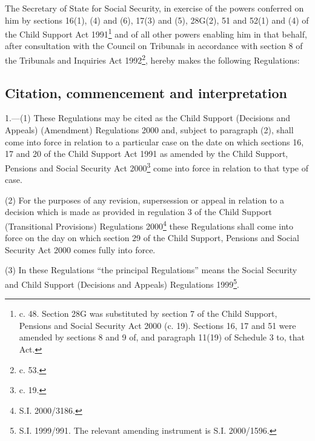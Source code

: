 \documentclass[12pt,a4paper]{article}
\title{\regstitle}
\author{S.I. 2000 No. 3185}
\date{Made 4th December 2000\\Laid before Parliament 6th December 2000\\Coming into force as provided in regulation 1(1)}
\begin{document}
\maketitle

\noindent
The Secretary of State for Social Security, in exercise of the powers conferred on him by sections 16(1), (4) and (6), 17(3) and (5), 28G(2), 51 and 52(1) and (4) of the Child Support Act 1991\footnote{ c. 48. Section 28G was substituted by section 7 of the Child Support, Pensions and Social Security Act 2000 (c. 19). Sections 16, 17 and 51 were amended by sections 8 and 9 of, and paragraph 11(19) of Schedule 3 to, that Act.} and of all other powers enabling him in that behalf, after consultation with the Council on Tribunals in accordance with section 8 of the Tribunals and Inquiries Act 1992\footnote{ c. 53.}, hereby makes the following Regulations: 

{\sloppy

\tableofcontents

}

\bigskip

\setcounter{secnumdepth}{-2}

\subsection[1. Citation, commencement and interpretation]{Citation, commencement and interpretation}

1.---(1)  These Regulations may be cited as the Child Support (Decisions and Appeals) (Amendment) Regulations 2000 and, subject to paragraph (2), shall come into force in relation to a particular case on the date on which sections 16, 17 and 20 of the Child Support Act 1991 as amended by the Child Support, Pensions and Social Security Act 2000\footnote{ c. 19.} come into force in relation to that type of case.

(2) For the purposes of any revision, supersession or appeal in relation to a decision which is made as provided in regulation 3 of the Child Support (Transitional Provisions) Regulations 2000\footnote{\frenchspacing S.I. 2000/3186.} these Regulations shall come into force on the day on which section 29 of the Child Support, Pensions and Social Security Act 2000 comes fully into force.

(3) In these Regulations “the principal Regulations” means the Social Security and Child Support (Decisions and Appeals) Regulations 1999\footnote{\frenchspacing S.I. 1999/991. The relevant amending instrument is S.I. 2000/1596.}.
\end{document}
